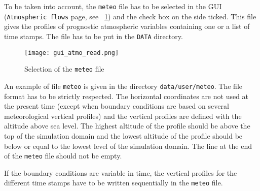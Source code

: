 To be taken into account, the \texttt{meteo} file has to be selected in the GUI
(\texttt{Atmospheric flows} page, see \figurename~\ref{fig:meteo}) and the check
box on the side ticked. This file gives the profiles of prognostic atmospheric
variables containing one or a list of time stamps. The file has to be put in the
\texttt{DATA} directory.
%
\begin{figure}[htbp]
\centerline{\texttt{[image: gui\_atmo\_read.png]}}
\caption{Selection of the \texttt{meteo} file}
\label{fig:meteo}
\end{figure}
%
An example of file \texttt{meteo} is given in the directory
\texttt{data/user/meteo}. The file format has to be strictly respected.
The horizontal coordinates are not used at the present time (except when
boundary conditions are based on several meteorological vertical profiles)
and the vertical profiles are defined with the altitude above sea level. The
highest altitude of the profile should be above the top of the simulation domain
and the lowest altitude of the profile should be below or equal to the lowest
level of the simulation domain. The line at the end of the \texttt{meteo} file
should not be empty.

If the boundary conditions are variable in time, the vertical profiles for
the different time stamps have to be written sequentially in the \texttt{meteo}
file.

